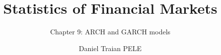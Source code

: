 \title[Statistics of Financial Markets]{Statistics of Financial Markets}
\subtitle{Chapter 9: ARCH and GARCH models}
\author[D.T. Pele]{Daniel Traian PELE}
\date{}

\providecommand{\sfmapplink}[3]{\hypertarget{#2}{}\hyperlink{#1}{\beamergotobutton{#3}}}  %
\providecommand{\sfmappback}[2]{\begin{tikzpicture}[remember picture,overlay]\node[anchor=south east] at ([xshift=-3mm,yshift=7mm]current page.south east){\hyperlink{#1}{\beamerreturnbutton{#2}}};\end{tikzpicture}}  %
\providecommand{\sfmchlink}[2]{\href{#1}{#2}}  %
\providecommand{\sfmchlinkt}[2]{\href{#1}{\usebeamercolor[fg]{frametitle}#2}}  %


